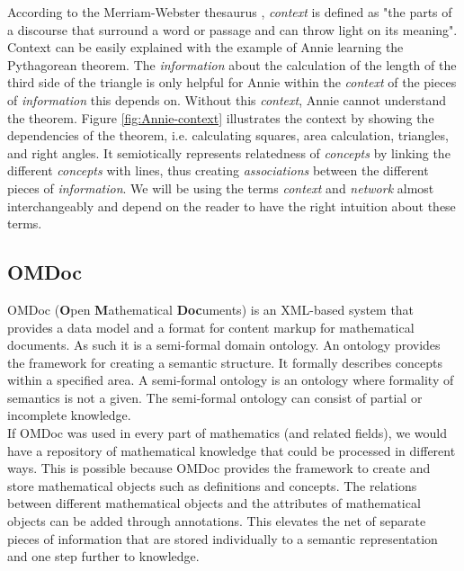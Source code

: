 \documentclass[twoside, 12pt]{article}
\begin{document}
According to the Merriam-Webster thesaurus \cite{Webster:npentrel14}, \textit{context} is defined as "the parts of a discourse that surround a word or passage and can throw light on its meaning". Context can be easily explained with the example of Annie learning the Pythagorean theorem. The \textit{information} about the calculation of the length of the third side of the triangle is only helpful for Annie within the \textit{context} of the pieces of \textit{information} this depends on. Without this \textit{context}, Annie cannot understand the theorem. Figure \ref{fig:Annie-context} illustrates the context by showing the dependencies of the theorem, i.e. calculating squares, area calculation, triangles, and right angles. It semiotically represents relatedness of \textit{concepts} by linking the different \textit{concepts} with lines, thus creating \textit{associations} between the different pieces of \textit{information}. We will be using the terms \textit{context} and \textit{network} almost interchangeably and depend on the reader to have the right intuition about these terms.\\

\subsection{OMDoc}
\label{sec:OMDoc}

OMDoc (\textbf{O}pen \textbf{M}athematical \textbf{Doc}uments) \cite{Kohlhase:OMDoc1.2} is an XML-based system that provides a data model and a format for content markup for mathematical documents. As such it is a semi-formal domain ontology. An ontology provides the framework for creating a semantic structure. It formally describes concepts within a specified area. A semi-formal ontology \cite{Sheth:npentrel14} is an ontology where formality of semantics is not a given. The semi-formal ontology can consist of partial or incomplete knowledge. \\

If OMDoc was used in every part of mathematics (and related fields), we would have a repository of mathematical knowledge that could be processed in different ways. This is possible because OMDoc provides the framework to create and store mathematical objects such as definitions and concepts. The relations between different mathematical objects and the attributes of mathematical objects can be added through annotations. This elevates the net of separate pieces of information that are stored individually to a semantic representation and one step further to knowledge.\\
\end{document}
